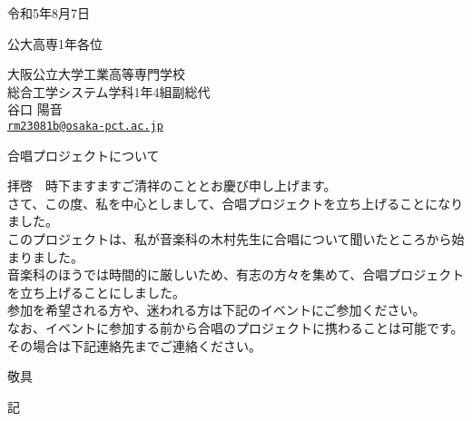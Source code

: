 \documentclass{jlreq}
\begin{document}
\begin{flushright}
    令和5年8月7日
\end{flushright}
\begin{flushleft}
    公大高専1年各位
\end{flushleft}
\begin{flushright}
    大阪公立大学工業高等専門学校\\
    総合工学システム学科1年4組副総代\\
    谷口 陽音\\
    \href{mailto:rm23081b@osaka-pct.ac.jp}{\nolinkurl{rm23081b@osaka-pct.ac.jp}}\\
\end{flushright}
\begin{center}
    \begin{Large}
        合唱プロジェクトについて
    \end{Large}
\end{center}
拝啓　時下ますますご清祥のこととお慶び申し上げます。\\
さて、この度、私を中心としまして、合唱プロジェクトを立ち上げることになりました。\\
このプロジェクトは、私が音楽科の木村先生に合唱について聞いたところから始まりました。\\
音楽科のほうでは時間的に厳しいため、有志の方々を集めて、合唱プロジェクトを立ち上げることにしました。\\
参加を希望される方や、迷われる方は下記のイベントにご参加ください。\\
なお、イベントに参加する前から合唱のプロジェクトに携わることは可能です。\\
その場合は下記連絡先までご連絡ください。\\
\begin{flushright}
    敬具
\end{flushright}
\begin{center}
    記\\
\end{center}
\end{document}
